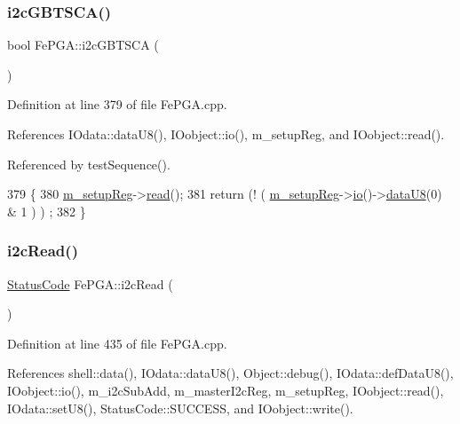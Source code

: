 \subsubsection{\texorpdfstring{i2c\+G\+B\+T\+S\+C\+A()}{i2cGBTSCA()}}
{\footnotesize\ttfamily bool Fe\+P\+G\+A\+::i2c\+G\+B\+T\+S\+CA (\begin{DoxyParamCaption}{ }\end{DoxyParamCaption})}



Definition at line 379 of file Fe\+P\+G\+A.\+cpp.



References I\+Odata\+::data\+U8(), I\+Oobject\+::io(), m\+\_\+setup\+Reg, and I\+Oobject\+::read().



Referenced by test\+Sequence().


\begin{DoxyCode}
379                       \{
380   \hyperlink{classFePGA_a0255fe229013986b4387c3a75ddf4e97}{m\_setupReg}->\hyperlink{classIOobject_aa07610c11963b1db6710e3c76ceea456}{read}();
381   \textcolor{keywordflow}{return} (! ( \hyperlink{classFePGA_a0255fe229013986b4387c3a75ddf4e97}{m\_setupReg}->\hyperlink{classIOobject_af04fb94137c3d86849f478ac5afab5d1}{io}()->\hyperlink{classIOdata_a75e9c318dbac3a39402179070943d4bc}{dataU8}(0) & 1 ) ) ;
382 \}
\end{DoxyCode}
\mbox{\label{classFePGA_a939c5c23077210a2ad851a12694657a4}} 
\subsubsection{\texorpdfstring{i2c\+Read()}{i2cRead()}\hspace{0.1cm}{\footnotesize\ttfamily [1/2]}}
{\footnotesize\ttfamily \hyperlink{classStatusCode}{Status\+Code} Fe\+P\+G\+A\+::i2c\+Read (\begin{DoxyParamCaption}{ }\end{DoxyParamCaption})}



Definition at line 435 of file Fe\+P\+G\+A.\+cpp.



References shell\+::data(), I\+Odata\+::data\+U8(), Object\+::debug(), I\+Odata\+::def\+Data\+U8(), I\+Oobject\+::io(), m\+\_\+i2c\+Sub\+Add, m\+\_\+master\+I2c\+Reg, m\+\_\+setup\+Reg, I\+Oobject\+::read(), I\+Odata\+::set\+U8(), Status\+Code\+::\+S\+U\+C\+C\+E\+SS, and I\+Oobject\+::write().



